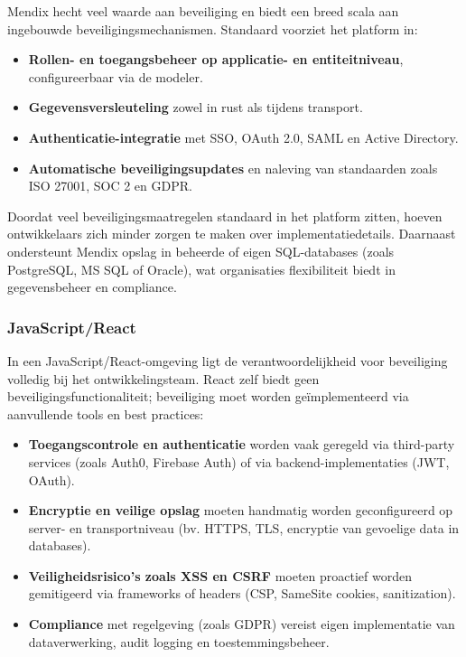 Mendix hecht veel waarde aan beveiliging en biedt een breed scala aan ingebouwde beveiligingsmechanismen. Standaard voorziet het platform in:
\begin{itemize}
    \item \textbf{Rollen- en toegangsbeheer op applicatie- en entiteitniveau}, configureerbaar via de modeler.
    \item \textbf{Gegevensversleuteling} zowel in rust als tijdens transport.
    \item \textbf{Authenticatie-integratie} met SSO, OAuth 2.0, SAML en Active Directory.
    \item \textbf{Automatische beveiligingsupdates} en naleving van standaarden zoals ISO 27001, SOC 2 en GDPR.
\end{itemize}

Doordat veel beveiligingsmaatregelen standaard in het platform zitten, hoeven ontwikkelaars zich minder zorgen te maken over implementatiedetails. Daarnaast ondersteunt Mendix opslag in beheerde of eigen SQL-databases (zoals PostgreSQL, MS SQL of Oracle), wat organisaties flexibiliteit biedt in gegevensbeheer en compliance.

\subsubsection{JavaScript/React}

In een JavaScript/React-omgeving ligt de verantwoordelijkheid voor beveiliging volledig bij het ontwikkelingsteam. React zelf biedt geen beveiligingsfunctionaliteit; beveiliging moet worden geïmplementeerd via aanvullende tools en best practices:
\begin{itemize}
    \item \textbf{Toegangscontrole en authenticatie} worden vaak geregeld via third-party services (zoals Auth0, Firebase Auth) of via backend-implementaties (JWT, OAuth).
    \item \textbf{Encryptie en veilige opslag} moeten handmatig worden geconfigureerd op server- en transportniveau (bv. HTTPS, TLS, encryptie van gevoelige data in databases).
    \item \textbf{Veiligheidsrisico’s zoals XSS en CSRF} moeten proactief worden gemitigeerd via frameworks of headers (CSP, SameSite cookies, sanitization).
    \item \textbf{Compliance} met regelgeving (zoals GDPR) vereist eigen implementatie van dataverwerking, audit logging en toestemmingsbeheer.
\end{itemize}

